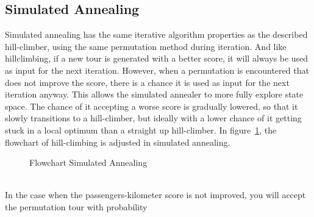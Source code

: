 \documentclass[journal]{IEEEtran}
\begin{document}
\subsection{Simulated Annealing}
Simulated annealing has the same iterative algorithm properties as the described hill-climber, using the same permutation method during iteration. And like hillclimbing, if a new tour is generated with a better score, it will always be used as input for the next iteration. However, when a permutation is encountered that does not improve the score, there is a chance it is used as input for the next iteration anyway. This allows the simulated annealer to more fully explore state space. The chance of it accepting a worse score is gradually lowered, so that it slowly transitions to a hill-climber, but ideally with a lower chance of it getting stuck in a local optimum than a straight up hill-climber. In figure~\ref{fig:flowchart_sa}, the flowchart of hill-climbing is adjusted in simulated annealing.\\
\begin{figure}[!h]
\centering

\caption{Flowchart Simulated Annealing}
\label{fig:flowchart_sa}
\end{figure}
\\
In the case when the passengers-kilometer score is not improved, you will accept the permutation tour with probability 
\end{document}
